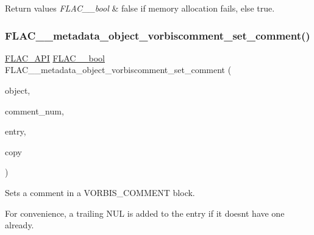 \begin{DoxyRetVals}{Return values}
{\em F\+L\+A\+C\+\_\+\+\_\+bool} & {\ttfamily false} if memory allocation fails, else {\ttfamily true}. \\
\hline
\end{DoxyRetVals}
\mbox{\label{group__flac__metadata__object_gadf034b2c385e7932c6be2d724a0deae3}} 
\subsubsection{\texorpdfstring{F\+L\+A\+C\+\_\+\+\_\+metadata\+\_\+object\+\_\+vorbiscomment\+\_\+set\+\_\+comment()}{FLAC\_\_metadata\_object\_vorbiscomment\_set\_comment()}}
{\footnotesize\ttfamily \hyperlink{group__flac__export_ga56ca07df8a23310707732b1c0007d6f5}{F\+L\+A\+C\+\_\+\+A\+PI} \hyperlink{ordinals_8h_a95103469f1cbd78b8cf250194985b34e}{F\+L\+A\+C\+\_\+\+\_\+bool} F\+L\+A\+C\+\_\+\+\_\+metadata\+\_\+object\+\_\+vorbiscomment\+\_\+set\+\_\+comment (\begin{DoxyParamCaption}\item[{\hyperlink{struct_f_l_a_c_____stream_metadata}{F\+L\+A\+C\+\_\+\+\_\+\+Stream\+Metadata} $\ast$}]{object,  }\item[{unsigned}]{comment\+\_\+num,  }\item[{\hyperlink{struct_f_l_a_c_____stream_metadata___vorbis_comment___entry}{F\+L\+A\+C\+\_\+\+\_\+\+Stream\+Metadata\+\_\+\+Vorbis\+Comment\+\_\+\+Entry}}]{entry,  }\item[{\hyperlink{ordinals_8h_a95103469f1cbd78b8cf250194985b34e}{F\+L\+A\+C\+\_\+\+\_\+bool}}]{copy }\end{DoxyParamCaption})}

Sets a comment in a V\+O\+R\+B\+I\+S\+\_\+\+C\+O\+M\+M\+E\+NT block.

For convenience, a trailing N\+UL is added to the entry if it doesn\textquotesingle{}t have one already.

